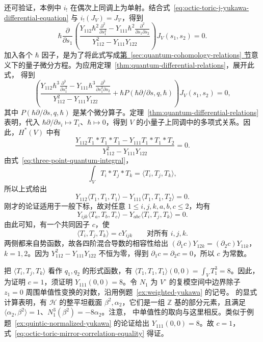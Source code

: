 \begin{example}
还可验证，本例中 $i_!$ 在偶次上同调上为单射。结合式~\eqref{eq:octic-toric-j-yukawa-differential-equation} 与 $i_!(J_V)=J_{\mathcal V}$，得到
\begin{equation}\label{eq:octic-ordinary-j-yukawa-quantum-equation}
\hbar\frac\partial{\partial s_1}\left(\frac{Y_{112}\hbar^2\frac{\partial^2}{\partial s_1^2}-Y_{111}\hbar^2\frac{\partial^2}{\partial s_1\partial s_2}}{Y_{112}^2-Y_{111}Y_{122}}\right)J_V(s_1,s_2)=0.
\end{equation}
加入各个 $\hbar$ 因子，是为了将此式写成\hyperref[sec:quantum-cohomology-relations]{第~\ref*{sec:quantum-cohomology-relations} 节}意义下的量子微分方程。为应用定理~\ref{thm:quantum-differential-relations}，展开此式，
得到
\[
\left(\frac{Y_{112}\hbar^3\frac{\partial^3}{\partial s_1^3}-Y_{111}\hbar^3\frac{\partial^3}{\partial s_1^2\partial s_2}}{Y_{112}^2-Y_{111}Y_{122}}
+\hbar P(\hbar\partial/\partial s,q,\hbar)\right)J_V(s_1,s_2)=0,
\]
其中 $P(\hbar\partial/\partial s,q,\hbar)$ 是某个微分算子。定理~\ref{thm:quantum-differential-relations} 表明，代入 $\hbar\partial/\partial s_i\mapsto T_i$、$\hbar\mapsto0$，得到 $V$ 的小量子上同调中的多项式关系。因此，$H^*(V)$ 中有
\[
\frac{Y_{112}T_1*T_1*T_1-Y_{111}T_1*T_1*T_2}{Y_{112}^2-Y_{111}Y_{122}}=0.
\]
由式~\eqref{eq:three-point-quantum-integral}，
\[
\int_V T_i*T_j*T_k=\langle T_i,T_j,T_k\rangle,
\]
所以上式给出
\[
Y_{112}\langle T_1,T_1,T_1\rangle-Y_{111}\langle T_1,T_1,T_2\rangle=0.
\]
刚才的论证适用于一般下标，故对任意 $1\le i,j,k,a,b,c\le2$，均有
\[
Y_{ijk}\langle T_a,T_b,T_c\rangle-Y_{abc}\langle T_i,T_j,T_k\rangle=0.
\]
由此可知，有一个共同因子 $c$，使
\[
\langle T_i,T_j,T_k\rangle=cY_{ijk}\qquad\text{对所有 }i,j,k.
\]
两侧都来自势函数，故各四阶混合导数的相容性给出 $(\partial_1c)Y_{12k}=(\partial_2c)Y_{11k}$，$k=1,2$。因为 $Y_{112}^2-Y_{111}Y_{122}$ 不恒为零，得到 $\partial_1c=\partial_2c=0$，所以 $c$ 为常数。

把 $\langle T_i,T_j,T_k\rangle$ 看作 $q_1,q_2$ 的形式函数，有 $\langle T_1,T_1,T_1\rangle(0,0)=\int_VT_1^3=8$。因此，为证明 $c=1$，须证明 $Y_{111}(0,0)=8$。令 $N_1$ 为 $V^\circ$ 的复模空间中边界除子 $z_1=0$ 周围单值性变换的对数，沿用例题~\ref{ex:weighted-yukawa} 的记号。 的显式计算表明，有 $\mathcal H$ 的整平坦截面 $\beta^2,\alpha_2$，它们是一组 $\mathbb Z$ 基的部分元素，且满足 $\langle\alpha_2,\beta^2\rangle=1$、$N_1^3(\beta^2)=-8\alpha_2$。注意， 中单值性的取向与这里相反。类似于例题~\ref{ex:quintic-normalized-yukawa} 的论证给出 $Y_{111}(0,0)=8$。故 $c=1$，式~\eqref{eq:octic-toric-mirror-correlation-equality} 得证。


\end{example}
